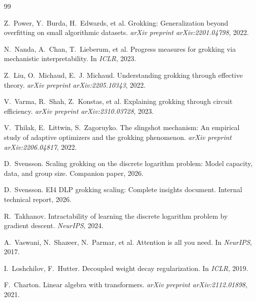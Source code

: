 \documentclass[11pt]{article}
\begin{document}
\begin{thebibliography}{99}

Z.~Power, Y.~Burda, H.~Edwards, et al.
\newblock Grokking: Generalization beyond overfitting on small algorithmic datasets.
\newblock \emph{arXiv preprint arXiv:2201.04798}, 2022.

N.~Nanda, A.~Chan, T.~Lieberum, et al.
\newblock Progress measures for grokking via mechanistic interpretability.
\newblock In \emph{ICLR}, 2023.

Z.~Liu, O.~Michaud, E.~J. Michaud.
\newblock Understanding grokking through effective theory.
\newblock \emph{arXiv preprint arXiv:2205.10343}, 2022.

V.~Varma, R.~Shah, Z.~Konstas, et al.
\newblock Explaining grokking through circuit efficiency.
\newblock \emph{arXiv preprint arXiv:2310.03728}, 2023.

V.~Thilak, E.~Littwin, S.~Zagoruyko.
\newblock The slingshot mechanism: An empirical study of adaptive optimizers and the grokking phenomenon.
\newblock \emph{arXiv preprint arXiv:2206.04817}, 2022.

D.~Svensson.
\newblock Scaling grokking on the discrete logarithm problem: Model capacity, data, and group size.
\newblock Companion paper, 2026.

D.~Svensson.
\newblock EI4 DLP grokking scaling: Complete insights document.
\newblock Internal technical report, 2026.

R.~Takhanov.
\newblock Intractability of learning the discrete logarithm problem by gradient descent.
\newblock \emph{NeurIPS}, 2024.

A.~Vaswani, N.~Shazeer, N.~Parmar, et al.
\newblock Attention is all you need.
\newblock In \emph{NeurIPS}, 2017.

I.~Loshchilov, F.~Hutter.
\newblock Decoupled weight decay regularization.
\newblock In \emph{ICLR}, 2019.

F.~Charton.
\newblock Linear algebra with transformers.
\newblock \emph{arXiv preprint arXiv:2112.01898}, 2021.


\end{thebibliography}
\end{document}
